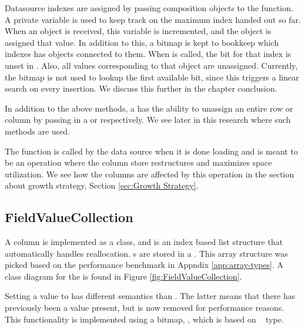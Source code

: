 Datasource indexes are assigned by passing composition objects to the   function. A private variable  is used to keep track on the maximum index handed out so far. When an object is received, this variable is incremented, and the object is assigned that value. In addition to this, a bitmap  is kept to bookkeep which indexes has objects connected to them. When  is called, the bit for that index is unset in . Also, all values corresponding to that object are unassigned. Currently, the  bitmap is not used to lookup the first available bit, since this triggers a linear search on every insertion. We discuss this further in the chapter conclusion.

In addition to the above methods, a  has the ability to unassign an entire row or column by passing in a  or  respectively. We see later in this research where such methods are used.

The  function is called by the data source when it is done loading and is meant to be an operation where the column store restructures and maximizes space utilization. We see how the columns are affected by this operation in the section about growth strategy, Section \ref{sec:Growth Strategy}.


\subsection{FieldValueCollection}
\label{sub:FieldValueCollection}

A column is implemented as a  class, and is an index based list structure that automatically handles reallocation. s are stored in a . This array structure was picked based on the performance benchmark in Appndix \ref{app:array-types}. A class diagram for the  is found in Figure \ref{fig:FieldValueCollection}.

Setting a value to  has different semantics than . The latter means that there has previously been a value present, but is now removed for performance reasons. This functionality is implemented using a bitmap, , which is based on \delphi~ type. 

